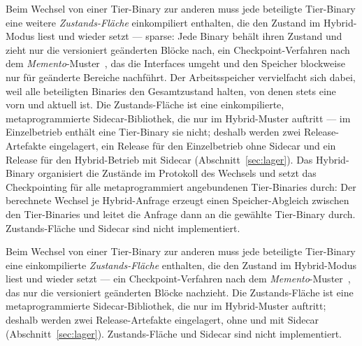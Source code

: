 \begin{nurlang}
Beim Wechsel von einer Tier-Binary zur anderen muss jede beteiligte Tier-Binary eine weitere
\emph{Zustands-Fläche} einkompiliert enthalten, die den Zustand im Hybrid-Modus liest und wieder setzt ---
sparse: Jede Binary behält ihren Zustand und zieht nur die versioniert geänderten Blöcke nach, ein
Checkpoint-Verfahren nach dem \emph{Memento}-Muster~\cite{gamma1994patterns}, das die Interfaces umgeht
und den Speicher blockweise nur für geänderte Bereiche nachführt. Der Arbeitsspeicher vervielfacht sich
dabei, weil alle beteiligten Binaries den Gesamtzustand halten, von denen stets eine vorn und aktuell
ist. Die Zustands-Fläche ist eine einkompilierte, metaprogrammierte Sidecar-Bibliothek, die nur im
Hybrid-Muster auftritt --- im Einzelbetrieb enthält eine Tier-Binary sie nicht; deshalb werden zwei
Release-Artefakte eingelagert, ein Release für den Einzelbetrieb ohne Sidecar und ein Release für den
Hybrid-Betrieb mit Sidecar (Abschnitt~\ref{sec:lager}). Das Hybrid-Binary organisiert die Zustände im
Protokoll des Wechsels und setzt das Checkpointing für alle metaprogrammiert angebundenen Tier-Binaries
durch: Der berechnete Wechsel je Hybrid-Anfrage erzeugt einen Speicher-Abgleich zwischen den
Tier-Binaries und leitet die Anfrage dann an die gewählte Tier-Binary durch. Zustands-Fläche und Sidecar
sind nicht implementiert.
\end{nurlang}
\begin{nurkurz}
Beim Wechsel von einer Tier-Binary zur anderen muss jede beteiligte Tier-Binary eine einkompilierte
\emph{Zustands-Fläche} enthalten, die den Zustand im Hybrid-Modus liest und wieder setzt --- ein
Checkpoint-Verfahren nach dem \emph{Memento}-Muster~\cite{gamma1994patterns}, das nur die versioniert
geänderten Blöcke nachzieht. Die Zustands-Fläche ist eine metaprogrammierte Sidecar-Bibliothek, die nur im
Hybrid-Muster auftritt; deshalb werden zwei Release-Artefakte eingelagert, ohne und mit Sidecar
(Abschnitt~\ref{sec:lager}). Zustands-Fläche und Sidecar sind nicht implementiert.
\end{nurkurz}


